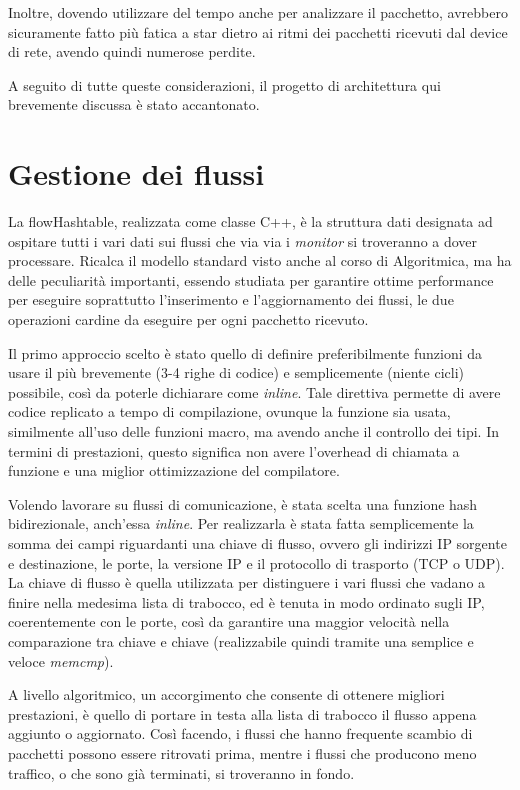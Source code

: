 Inoltre, dovendo utilizzare del tempo anche per analizzare il pacchetto, avrebbero sicuramente fatto più fatica a star dietro ai ritmi dei pacchetti ricevuti dal device di rete, avendo quindi numerose perdite.

A seguito di tutte queste considerazioni, il progetto di architettura qui brevemente discussa è stato accantonato.

\section{Gestione dei flussi}\label{impl-fht}

La flowHashtable, realizzata come classe C++, è la struttura dati designata ad ospitare tutti i vari dati sui flussi che via via i \emph{monitor} si troveranno a dover processare. Ricalca il modello standard visto anche al corso di Algoritmica, ma ha delle peculiarità importanti, essendo studiata per garantire ottime performance per eseguire soprattutto l'inserimento e l'aggiornamento dei flussi, le due operazioni cardine da eseguire per ogni pacchetto ricevuto.

Il primo approccio scelto è stato quello di definire preferibilmente funzioni da usare il più brevemente (3-4 righe di codice) e semplicemente (niente cicli) possibile, così da poterle dichiarare come \emph{inline}. Tale direttiva permette di avere codice replicato a tempo di compilazione, ovunque la funzione sia usata, similmente all'uso delle funzioni macro, ma avendo anche il controllo dei tipi. In termini di prestazioni, questo significa non avere l'overhead di chiamata a funzione e una miglior ottimizzazione del compilatore.

Volendo lavorare su flussi di comunicazione, è stata scelta una funzione hash bidirezionale, anch'essa \emph{inline}. Per realizzarla è stata fatta semplicemente la somma dei campi riguardanti una chiave di flusso, ovvero gli indirizzi IP sorgente e destinazione, le porte, la versione IP e il protocollo di trasporto (TCP o UDP). La chiave di flusso è quella utilizzata per distinguere i vari flussi che vadano a finire nella medesima lista di trabocco, ed è tenuta in modo ordinato sugli IP, coerentemente con le porte, così da garantire una maggior velocità nella comparazione tra chiave e chiave (realizzabile quindi tramite una semplice e veloce \emph{memcmp}).

A livello algoritmico, un accorgimento che consente di ottenere migliori prestazioni, è quello di portare in testa alla lista di trabocco il flusso appena aggiunto o aggiornato. Così facendo, i flussi che hanno frequente scambio di pacchetti possono essere ritrovati prima, mentre i flussi che producono meno traffico, o che sono già terminati, si troveranno in fondo.

